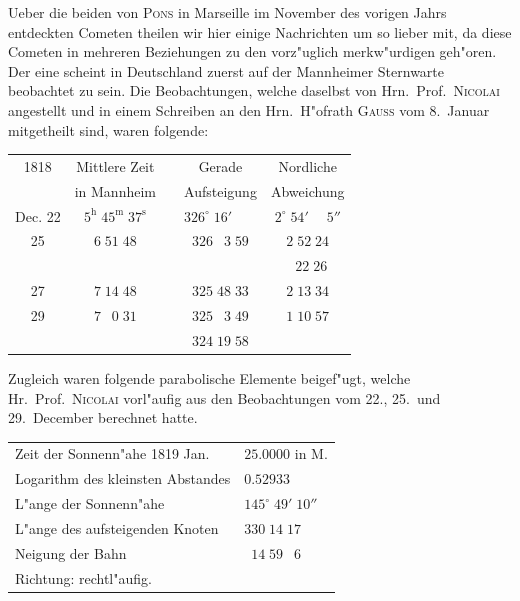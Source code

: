 \documentclass[12pt,a4paper]{article}
\begin{document}
Ueber die beiden von \textsc{Pons} in Marseille im November des vorigen Jahrs entdeckten Cometen
theilen wir hier einige Nachrichten um so lieber mit, da diese Cometen in mehreren Beziehungen zu den
vorz"uglich merkw"urdigen geh"oren. Der eine scheint in Deutschland zuerst auf der Mannheimer Sternwarte
beobachtet zu sein. Die Beobachtungen, welche daselbst von Hrn.~Prof.~\textsc{Nicolai} angestellt und in einem
Schreiben an den Hrn.~H"ofrath \textsc{Gauss} vom 8.~Januar mitgetheilt sind, waren folgende:

\begin{center}
\small
\begin{tabular}{c|c|c|c|c}
\toprule
1818 & Mittlere Zeit & & Gerade & Nordliche \\
& in Mannheim & & Aufsteigung & Abweichung \\
\midrule
Dec. 22 & $5^{\mathrm{h}}\;45^{\mathrm{m}}\;37^{\mathrm{s}}$ & & $326^{\circ}\;16'\;\phantom{0}\phantom{0}\phantom{0}$ & $2^{\circ}\;54'\;\phantom{0}\phantom{0}5''$ \\
\phantom{22} 25 & $6\;51\;48$ & & $326\;\phantom{0}3\;59$ & $2\;52\;24$ \\
& & & & \phantom{0}\phantom{0}\phantom{0}$\phantom{0}22\;26$ \\
\phantom{22} 27 & $7\;14\;48$ & & $325\;48\;33$ & $2\;13\;34$ \\
\phantom{22} 29 & $7\;\phantom{0}0\;31$ & & $325\;\phantom{0}3\;49$ & $1\;10\;57$ \\
\phantom{22} & & & $324\;19\;58$ & \\
\bottomrule
\end{tabular}
\end{center}

Zugleich waren folgende parabolische Elemente beigef"ugt, welche Hr.~Prof.~\textsc{Nicolai} vorl"aufig aus
den Beobachtungen vom 22., 25.~und 29.~December berechnet hatte.

\begin{center}
\begin{tabular}{l@{\dotfill}l}
Zeit der Sonnenn"ahe 1819 Jan. & $25.0000$ in M. \\
Logarithm des kleinsten Abstandes & $0.52933$ \\
L"ange der Sonnenn"ahe & $145^{\circ}\;49'\;10''$ \\
L"ange des aufsteigenden Knoten & $330\;14\;17$ \\
Neigung der Bahn & $\phantom{0}14\;59\;\phantom{0}6$ \\
Richtung: rechtl"aufig. & \\
\end{tabular}
\end{center}
\end{document}
